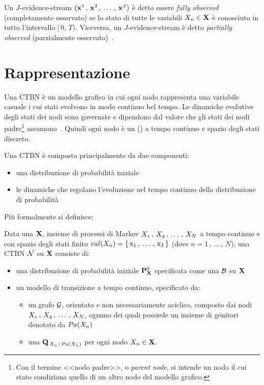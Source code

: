 Un $J$-evidence-stream $(\mathbf{x}^1\,,\,\mathbf{x}^2\,,\,\dotsc\,,\,\mathbf{x}^J)$ è detto essere \emph{fully observed} (completamente osservato) se lo stato di tutte le variabili $\mathnormal{X_n}\in\mathbf{X}$ è conosciuto in tutto l'intervallo $[\,0,\,T)$. Viceversa, un $J$-evidence-stream è detto \emph{partially observed} (parzialmente osservato)~\citep{Stella2012}.

\section{Rappresentazione}
\label{sec:ctbn-rappresentazione}
Una \acl{CTBN} è un modello grafico in cui ogni nodo rappresenta una variabile casuale i cui stati evolvono in modo continuo bel tempo. Le dinamiche evolutive degli stati dei nodi sono governate e dipendono dal valore che gli stati dei nodi padre\footnote{Con il termine <<nodo padre>>, o \emph{parent node}, si intende un nodo il cui stato condiziona quello di un altro nodo del modello grafico.} assumono~\citep{Stella2012}. Quindi ogni nodo è un \mprocess*{} \cond*{} () a tempo continuo e spazio degli stati discreto.

Una \acs{CTBN} è composta principalmente da due componenti:
\begin{itemize}
    \item una distribuzione di probabilità iniziale
    \item le dinamiche che regolano l'evoluzione nel tempo continuo della distribuzione di probabilità
\end{itemize}
Più formalmente si definisce:
\begin{definizione}
\label{defn:ctbn}
Data una \pv{} $\mathbf{X}$, insieme di processi di Markov $\mathnormal{X_1}\,,\,\mathnormal{X_2}\,,\,\dotsc\,,\,\mathnormal{X_N}$ a tempo continuo e con spazio degli stati finito $val(\mathnormal{X_n})=\{\,\mathrm{x_1}\,,\,\dotsc\,,\,\mathrm{x_J}\,\}$ (dove $n=1\,,\,\dotsc\,,\,N$), una \acs{CTBN} $\mathcal{N}$ su $\mathbf{X}$ consiste di:
\begin{itemize}
    \item una distribuzione di probabilità iniziale $\mathbf{P}^0_{\mathbf{X}}$ specificata come una \bn{} $\mathcal{B}$ su $\mathbf{X}$
    \item un modello di transizione a tempo continuo, specificato da:
    \begin{itemize}
        \item un grafo $\mathcal{G}$, orientato e non necessariamente aciclico, composto dai nodi $\mathnormal{X_1}\,,\,\mathnormal{X_2}\,,\,\dotsc\,,\,\mathnormal{X_N}$, ognuno dei quali possiede un insieme di genitori denotato da $Pa(\mathnormal{X_n})$
        \item una \im*{} \cond*{} $\mathbf{Q}_{\,\mathnormal{X_n}\,\arrowvert\,Pa(\mathnormal{X_n})}$ per ogni nodo $\mathnormal{X_n} \in \mathbf{X}$.
    \end{itemize}
\end{itemize}
\end{definizione}

